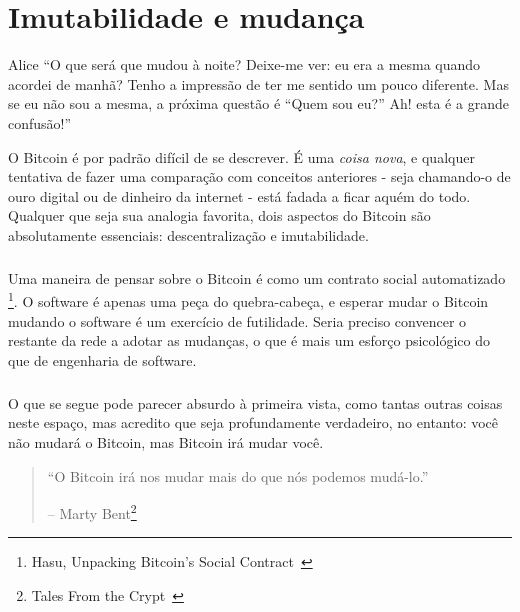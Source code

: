 \chapter{Imutabilidade e mudança}
\label{les:1}

\begin{chapquote}{Alice}
\enquote{O que será que mudou à noite? Deixe-me ver: eu era a mesma quando acordei de manhã? Tenho a impressão de ter me sentido um pouco diferente. Mas se eu não sou a mesma, a próxima questão é “Quem sou eu?” Ah! esta é a grande confusão!}
\end{chapquote}

O Bitcoin é por padrão difícil de se descrever. É uma \textit {coisa nova}, e qualquer tentativa de fazer uma comparação com conceitos anteriores - seja chamando-o de ouro digital ou de dinheiro da internet  - está fadada a ficar aquém do todo. Qualquer que seja sua analogia favorita, dois aspectos do Bitcoin são absolutamente essenciais: descentralização e imutabilidade.

\paragraph{}
Uma maneira de pensar sobre o Bitcoin é como um contrato social automatizado \footnote{Hasu, Unpacking Bitcoin's Social Contract~\cite {social-contract}}. O software é apenas uma peça do quebra-cabeça, e esperar mudar o Bitcoin mudando o software é um exercício de futilidade. Seria preciso convencer o restante da rede a adotar as mudanças, o que é mais um esforço psicológico do que de engenharia de software.

\paragraph{}
O que se segue pode parecer absurdo à primeira vista, como tantas outras coisas neste espaço, mas acredito que seja profundamente verdadeiro, no entanto: você não mudará o Bitcoin, mas Bitcoin irá mudar você.

\begin{quotation}\begin{samepage}
\enquote{O Bitcoin irá nos mudar mais do que nós podemos mudá-lo.}
\begin{flushright} -- Marty Bent\footnote{Tales From the Crypt~\cite{tftc21}}
\end{flushright}\end{samepage}\end{quotation}

